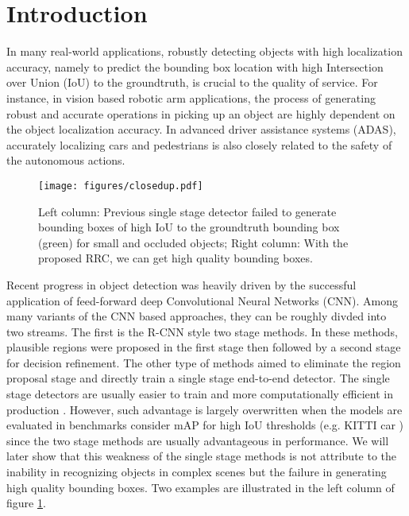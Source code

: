 \documentclass[10pt,twocolumn,letterpaper]{article}
\begin{document}
\section{Introduction}

In many real-world applications, robustly detecting objects with high localization accuracy, namely to predict the bounding box location with high Intersection over Union (IoU) to the groundtruth, is crucial to the quality of service. For instance, in vision based robotic arm applications, the process of generating robust and accurate operations in picking up an object are highly dependent on the object localization accuracy. In advanced driver assistance systems (ADAS), accurately localizing cars and pedestrians is also closely related to the safety of the autonomous actions.

\begin{figure}[t]
\begin{center}
\centerline{\texttt{[image: figures/closedup.pdf]}}
\caption{Left column: Previous single stage detector failed to generate bounding boxes of high IoU to the groundtruth bounding box (green) for small and occluded objects; Right column: With the proposed RRC, we can get high quality bounding boxes.}
\label{fig:fig1}
\end{center}
\vskip -0.2in
\end{figure}

Recent progress in object detection was heavily driven by the successful application of feed-forward deep Convolutional Neural Networks (CNN). Among many variants of the CNN based approaches, they can be roughly divded into two streams. The first is the R-CNN style \cite{girshick14CVPR} two stage methods. In these methods, plausible regions were proposed in the first stage then followed by a second stage for decision refinement. The other type of methods aimed to eliminate the region proposal stage and directly train a single stage end-to-end detector. The single stage detectors are usually easier to train and more computationally efficient in production \cite{liu15ssd}. However, such advantage is largely overwritten when the models are evaluated in benchmarks consider mAP for high IoU thresholds (e.g. KITTI car \cite{Geiger2012CVPR}) since the two stage methods are usually advantageous in performance. We will later show that this weakness of the single stage methods is not attribute to the inability in recognizing objects in complex scenes but the failure in generating high quality bounding boxes. Two examples are illustrated in the left column of figure \ref{fig:fig1}.
\end{document}
